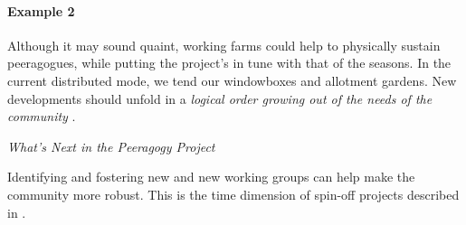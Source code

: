 \begin{refsection}
\paragraph{Example 2} Although it may sound quaint, working farms could help to physically
sustain peeragogues, while putting the project's  in tune with that of the seasons.  In the
current distributed mode, we tend our windowboxes and allotment gardens.   New developments
should unfold in a \emph{logical order growing out of the needs of the community} \cite[Chapter IX]{washington1986up}.

\begin{framed}
\noindent 
\emph{What's Next in the Peeragogy Project}
\begin{collectinmacro}{\HeartbeatWN}{}{}
Identifying and fostering new  and new working groups can help make the community more robust.  This is the time dimension of spin-off projects described in .
\end{collectinmacro}
\HeartbeatWN
\end{framed}

\printbibliography[heading=subbibliography]
\end{refsection}
